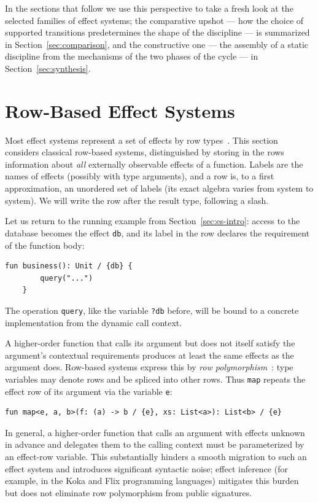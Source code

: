 \documentclass[11pt]{article}
\begin{document}
In the sections that follow we use this perspective to take a fresh look at the
selected families of effect systems; the comparative upshot --- how the choice of supported
transitions predetermines the shape of the discipline --- is summarized in Section~\ref{sec:comparison},
and the constructive one --- the assembly of a static discipline from the mechanisms of the two phases of the cycle --- in
Section~\ref{sec:synthesis}.


\section{Row-Based Effect Systems}
\label{sec:rows}

Most effect systems represent a set of effects by row
types~\cite{gaster1996polymorphic}. This section considers classical row-based
systems, distinguished by storing in the rows information about \emph{all} externally
observable effects of a function. Labels are the names of effects (possibly with type
arguments), and a row is, to a first approximation, an unordered set of labels (its exact
algebra varies from system to system). We will write the row after the result type,
following a slash.

Let us return to the running example from Section~\ref{sec:es-intro}: access to the
database becomes the effect \lstinline|db|, and its label in the row declares the
requirement of the function body:
\begin{lstlisting}[language=colang]
    fun business(): Unit / {db} {
        query("...")
    }
\end{lstlisting}
The operation \lstinline|query|, like the variable \lstinline|?db| before, will be bound
to a concrete implementation from the dynamic call context.

A higher-order function that calls its argument but does not itself satisfy the
argument's contextual requirements produces at least the same effects as the argument
does. Row-based systems express this by \emph{row
polymorphism}~\cite{gaster1996polymorphic}: type variables may denote rows and be
spliced into other rows. Thus \texttt{map} repeats the effect row of its argument via
the variable \texttt{e}:
\begin{lstlisting}[language=colang]
    fun map<e, a, b>(f: (a) -> b / {e}, xs: List<a>): List<b> / {e}
\end{lstlisting}
In general, a higher-order function that calls an argument with effects unknown in
advance and delegates them to the calling context must be parameterized by an
effect-row variable. This substantially hinders a smooth migration to such an effect
system and introduces significant syntactic noise; effect inference (for example, in the
Koka and Flix programming languages) mitigates this burden but does not eliminate row
polymorphism from public signatures.
\end{document}
